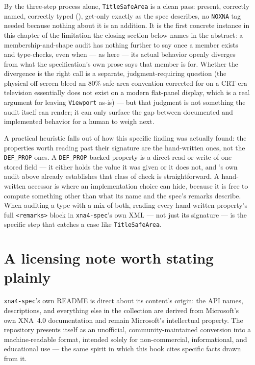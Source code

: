 By the three-step process alone, \texttt{TitleSafeArea} is a clean pass: present, correctly
named, correctly typed (), get-only exactly as the spec describes, no
\texttt{NOXNA} tag needed because nothing about it is an addition. It is the first concrete
instance in this chapter of the limitation the closing section below names in the abstract: a
membership-and-shape audit has nothing further to say once a member exists and type-checks,
even when --- as here --- its actual behavior openly diverges from what the specification's
own prose says that member is for. Whether the divergence is the right call is a separate,
judgment-requiring question (the physical off-screen bleed an 80\%-safe-area convention
corrected for on a CRT-era television essentially does not exist on a modern flat-panel
display, which is a real argument for leaving \texttt{Viewport} as-is) --- but that judgment is
not something the audit itself can render; it can only surface the gap between documented and
implemented behavior for a human to weigh next.

A practical heuristic falls out of how this specific finding was actually found: the properties
worth reading past their signature are the hand-written ones, not the \texttt{DEF\_PROP} ones.
A \texttt{DEF\_PROP}-backed property is a direct read or write of one stored field --- it either
holds the value it was given or it does not, and 's own audit above already
establishes that class of check is straightforward. A hand-written accessor is where an
implementation choice can hide, because it is free to compute something other than what its
name and the spec's remarks describe. When auditing a type with a mix of both, reading every
hand-written property's full \texttt{<remarks>} block in \texttt{xna4-spec}'s own XML --- not
just its signature --- is the specific step that catches a case like \texttt{TitleSafeArea}.

\section{A licensing note worth stating plainly}

\texttt{xna4-spec}'s own README is direct about its content's origin: the API names,
descriptions, and everything else in the collection are derived from Microsoft's own XNA~4.0
documentation and remain Microsoft's intellectual property. The repository presents itself as
an unofficial, community-maintained conversion into a machine-readable format, intended
solely for non-commercial, informational, and educational use --- the same spirit in which
this book cites specific facts drawn from it.

